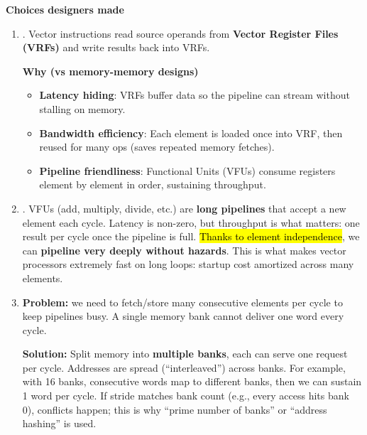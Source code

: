 \begin{flushleft}
    \textcolor{Green3}{ \textbf{Choices designers made}}
\end{flushleft}
\begin{enumerate}
    \item {}. Vector instructions read source operands from \textbf{Vector Register Files (VRFs)} and write results back into VRFs.

    \newpage

    \textcolor{Green3}{ \textbf{Why (vs memory-memory designs)}}
    \begin{itemize}
        \item[\textcolor{Green3}{\faIcon{check}}] \textbf{Latency hiding}: VRFs buffer data so the pipeline can stream without stalling on memory.
        \item[\textcolor{Green3}{\faIcon{check}}] \textbf{Bandwidth efficiency}: Each element is loaded once into VRF, then reused for many ops (saves repeated memory fetches).
        \item[\textcolor{Green3}{\faIcon{check}}] \textbf{Pipeline friendliness}: Functional Units (VFUs) consume registers element by element in order, sustaining throughput.
    \end{itemize}
    \item {}. VFUs (add, multiply, divide, etc.) are \textbf{long pipelines} that accept a new element each cycle. Latency is non-zero, but throughput is what matters: one result per cycle once the pipeline is full. \hl{Thanks to element independence}, we can \textbf{pipeline very deeply without hazards}. This is what makes vector processors extremely fast on long loops: startup cost amortized across many elements.
    \item {}

    \textcolor{Red2}{ \textbf{Problem:}} we need to fetch/store many consecutive elements per cycle to keep pipelines busy. A single memory bank cannot deliver one word every cycle.

    \textcolor{Green3}{ \textbf{Solution:}} Split memory into \textbf{multiple banks}, each can serve one request per cycle. Addresses are spread (``interleaved'') across banks. For example, with 16 banks, consecutive words map to different banks, then we can sustain 1 word per cycle. If stride matches bank count (e.g., every access hits bank 0), conflicts happen; this is why ``prime number of banks'' or ``address hashing'' is used.


\end{enumerate}
